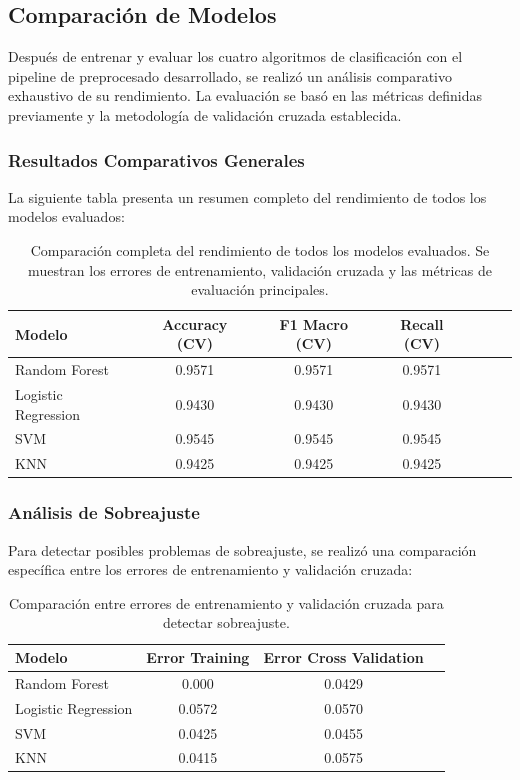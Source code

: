 \documentclass{article}
\begin{document}
\subsection{Comparación de Modelos}

Después de entrenar y evaluar los cuatro algoritmos de clasificación con el pipeline de preprocesado desarrollado, se realizó un análisis comparativo exhaustivo de su rendimiento. La evaluación se basó en las métricas definidas previamente y la metodología de validación cruzada establecida.

\subsubsection{Resultados Comparativos Generales}

La siguiente tabla presenta un resumen completo del rendimiento de todos los modelos evaluados:

\begin{table}[H]
\centering
\begin{tabular}{|l|c|c|c|c|c|c|}
\hline
\textbf{Modelo} &  \textbf{Accuracy (CV)} & \textbf{F1 Macro (CV)} & \textbf{Recall (CV)} \\
\hline
Random Forest  & 0.9571 & 0.9571 & 0.9571 \\
\hline
Logistic Regression  & 0.9430 & 0.9430 & 0.9430 \\
\hline
SVM  & 0.9545 & 0.9545 & 0.9545 \\
\hline
KNN  & 0.9425 & 0.9425 & 0.9425 \\
\hline
\end{tabular}
\caption{Comparación completa del rendimiento de todos los modelos evaluados. Se muestran los errores de entrenamiento, validación cruzada y las métricas de evaluación principales.}
\label{tab:comparacion_completa}
\end{table}

\subsubsection{Análisis de Sobreajuste}

Para detectar posibles problemas de sobreajuste, se realizó una comparación específica entre los errores de entrenamiento y validación cruzada:

\begin{table}[H]
\centering
\begin{tabular}{|l|c|c|c|}
\hline
\textbf{Modelo} & \textbf{Error Training} & \textbf{Error Cross Validation} \\
\hline
Random Forest & 0.000 & 0.0429 \\
\hline
Logistic Regression & 0.0572 & 0.0570  \\
\hline
SVM & 0.0425 & 0.0455 \\
\hline
KNN & 0.0415 & 0.0575  \\
\hline
\end{tabular}
\caption{Comparación entre errores de entrenamiento y validación cruzada para detectar sobreajuste.}
\label{tab:analisis_overfitting}
\end{table}
\end{document}
